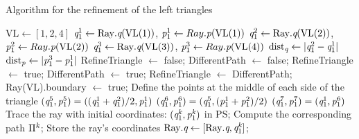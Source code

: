\begin{algorithm}[h]
\caption{Algorithm for the refinement of the left triangles}\label{alg:left_triangle}
\begin{algorithmic}[1]
\State $\textrm{VL}\gets [1,2,4]$
\State $\textit{q}_1^1\gets \textrm{Ray}.\textit{q}(\textrm{VL}(1))$, $\textit{p}_1^1\gets Ray.\textit{p}(\textrm{VL}(1))$
\State $\textit{q}_1^2\gets \textrm{Ray}.\textit{q}(\textrm{VL}(2))$, $\textit{p}_1^2\gets Ray.\textit{p}(\textrm{VL}(2))$
\State $\textit{q}_1^3\gets \textrm{Ray}.\textit{q}(\textrm{VL}(3))$, $\textit{p}_1^3\gets Ray.\textit{p}(\textrm{VL}(4))$
\State $\textrm{dist}_{\textit{q}}\gets \mbox{$|\textit{q}_1^2-\textit{q}_1^1|$}$
\State $\textrm{dist}_{\textit{p}}\gets \mbox{$|\textit{p}_1^{3}-\textit{p}_1^1|$}$
\State RefineTriangle $\gets$  false;
\State DifferentPath $\gets$  false;
\State RefineTriangle $\gets$  true;
\EndIf
{}
\State DifferentPath $\gets$  true;
\EndIf
\EndFor
{}
\State RefineTriangle $\gets$  DifferentPath;
\Else
{}
\State Ray(\textrm{VL}).boundary $\gets$ true; 
\EndIf
\EndIf
{}
\State Define the points at the middle of each side of the triangle
\State $(\textit{q}_1^5, \textit{p}_1^5) = ((\textit{q}_1^1+\textit{q}_1^2)/2, \textit{p}_1^1)$
\State $(\textit{q}_1^6, \textit{p}_1^6) = (\textit{q}_1^5, (\textit{p}_1^1+\textit{p}_1^2)/2)$
\State $(\textit{q}_1^7, \textit{p}_1^7) = (\textit{q}_1^1, \textit{p}_1^6)$
\State Trace the ray with initial coordinates: $(\textit{q}_1^{\textit{k}}, \textit{p}_1^{\textit{k}})$ in PS;
\State Compute the corresponding path $\Pi^{\textit{k}}$;
\State Store the ray's coordinates $\mbox{Ray}.\textit{q}\gets [\mbox{Ray}.\textit{q}, \textit{q}_1^{\textit{k}}]$;

\end{algorithmic}
\end{algorithm}

